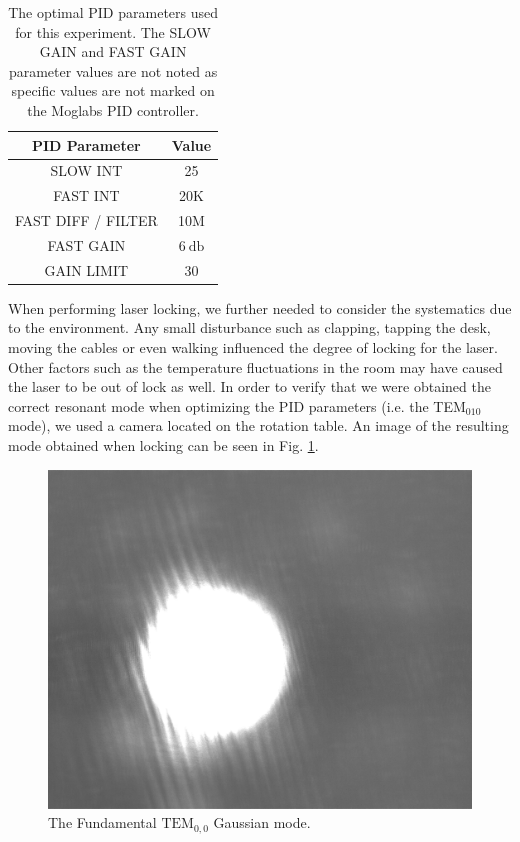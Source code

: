 \documentclass[a4paper]{report}
\numberwithin{equation}{section}
\begin{document}
\begin{table}[h!]
	\centering
	\begin{tabular}{|c|c|}
		\hline 
		PID Parameter & Value \\ \hline
		SLOW INT & 25 \\ \hline
		FAST INT & 20K \\ \hline
		FAST DIFF / FILTER & 10M \\ \hline
		FAST GAIN & $\SI{6}{\decibel}$ \\ \hline
		GAIN LIMIT & 30 \\ \hline
	\end{tabular}
	\caption{The optimal PID parameters used for this experiment. The SLOW GAIN and FAST GAIN parameter values are not noted
	as specific values are not marked on the Moglabs PID controller.}
	\label{tab:pid_params}
\end{table}

When performing laser locking, we further needed to consider the systematics due to the environment. 
Any small disturbance such as clapping, tapping the desk, moving the cables or even walking influenced the 
degree of locking for the laser. Other factors such as the temperature fluctuations in the room may have caused the 
laser to be out of lock as well. In order to verify that we were obtained the correct resonant mode when optimizing 
the PID parameters (i.e. the TEM$_{\mathrm{010}}$ mode), we used a camera located on the rotation table. An image of the 
resulting mode obtained when locking can be seen in Fig. \ref{fig:tem00-lock}. \par 


\begin{figure}[htpb]
    \centering
    \includegraphics[width=0.6\columnwidth]{tem00_lock}
    \caption{The Fundamental $\mathrm{TEM}_{0, 0}$ Gaussian mode.}
    \label{fig:tem00-lock}
\end{figure}	
\end{document}
